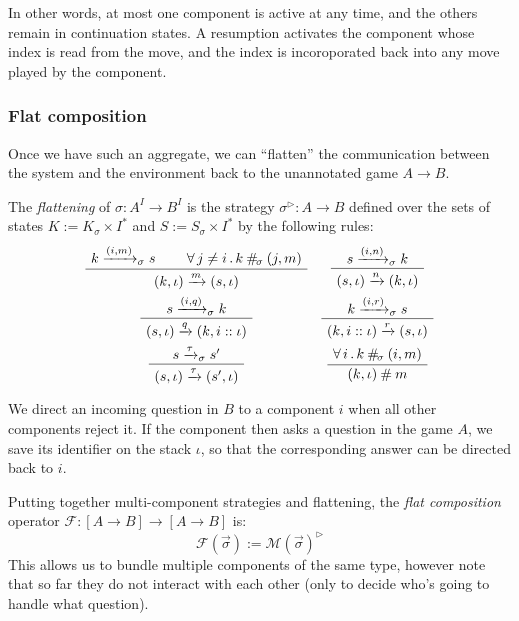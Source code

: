 In other words,
at most one component is active at any time,
and the others remain in continuation states.
A resumption activates the component whose index
is read from the move,
and the index is incoroporated back into
any move played by the component.

\subsubsection{Flat composition}

Once we have such an aggregate,
we can ``flatten'' the communication between
the system and the environment
back to the unannotated game $A \rightarrow B$.

\begin{definition}
The \emph{flattening} of $\sigma : A^I \rightarrow B^I$
is the strategy $\sigma^\rhd : A \rightarrow B$
defined over the sets of states
$K := K_\sigma \times I^*$ and
$S := S_\sigma \times I^*$ by the following rules:
\[
  \begin{array}{c@{\quad}c}
    \AxiomC{$k \xrightarrow{(i, m)}_\sigma s$}
    \AxiomC{$\forall \, j \ne i \,.\, k \: \#_{\!\sigma} \: (j, m)$}
    \BinaryInfC{$(k, \iota) \xrightarrow{m} (s, \iota)$}
    \DisplayProof
    &
    \AxiomC{$s \xrightarrow{(i, n)}_\sigma k$}
    \UnaryInfC{$(s, \iota) \xrightarrow{n} (k, \iota)$}
    \DisplayProof
    \\[1.5em]
    \AxiomC{$s \xrightarrow{(i, q)}_\sigma k$}
    \UnaryInfC{$(s, \iota) \xrightarrow{q} (k, i :: \iota)$}
    \DisplayProof
    &
    \AxiomC{$k \xrightarrow{(i, r)}_\sigma s$}
    \UnaryInfC{$(k, i :: \iota) \xrightarrow{r} (s, \iota)$}
    \DisplayProof
    \\[1.5em]
    \AxiomC{$s \xrightarrow{\tau}_\sigma s'$}
    \UnaryInfC{$(s, \iota) \xrightarrow{\tau} (s', \iota)$}
    \DisplayProof
    &
    \AxiomC{$\forall \,i\,.\, k \: \#_{\!\sigma} \: (i, m)$}
    \UnaryInfC{$(k, \iota) \:\#\: m$}
    \DisplayProof
  \end{array}
\]
\end{definition}

We direct an incoming question in $B$
to a component $i$ when all other components reject it.
If the component then asks a question in the game $A$,
we save its identifier on the stack $\iota$,
so that the corresponding answer can be directed back to $i$.

Putting together multi-component strategies and flattening,
the \emph{flat composition} operator
$\mathcal{F} : [A \rightarrow B] \rightarrow [A \rightarrow B]$
is:
\[
    \mathcal{F}(\vec{\sigma}) := \mathcal{M}(\vec{\sigma})^\rhd
\]
This allows us to bundle multiple components of the same type,
however note that so far they do not interact with each other
(only to decide who's going to handle what question).

